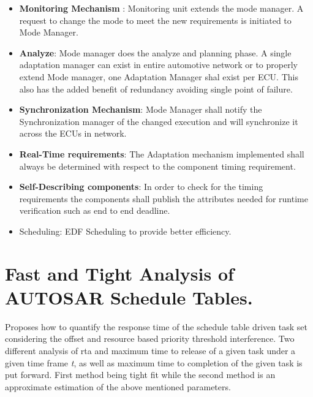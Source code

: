 \begin{minipage}{\linewidth}%
\end{minipage}
\begin{itemize}
	\item \textbf{Monitoring Mechanism} : Monitoring unit extends the mode manager. A request to change the mode to meet the new requirements is initiated to Mode Manager.
	\item \textbf{Analyze}: Mode manager does the analyze and planning phase. A single adaptation manager can exist in entire automotive network or to properly extend Mode manager, one Adaptation Manager shal exist per ECU. This also has the added benefit of redundancy avoiding single point of failure.
	\item \textbf{Synchronization Mechanism}: Mode Manager shall notify the Synchronization manager of the changed execution and will synchronize it across the ECUs in network.
	\item \textbf{Real-Time requirements}: The Adaptation mechanism implemented shall always be determined with respect to the component timing requirement.
	\item \textbf{Self-Describing components}: In order to check for the timing requirements the components shall publish the attributes needed for runtime verification such as end to end deadline.
	\item Scheduling: EDF Scheduling to provide better efficiency.
\end{itemize}
\section{Fast and Tight Analysis of AUTOSAR Schedule Tables.}
Proposes how to quantify the response time of the schedule table driven task set considering the offset and resource based priority threshold interference.
Two different analysis of rta and maximum time to release of a given task under a given time frame \textit{t}, as well as maximum time to completion of the given task is put forward.
First method being tight fit while the second method is an approximate estimation of the above mentioned parameters.
